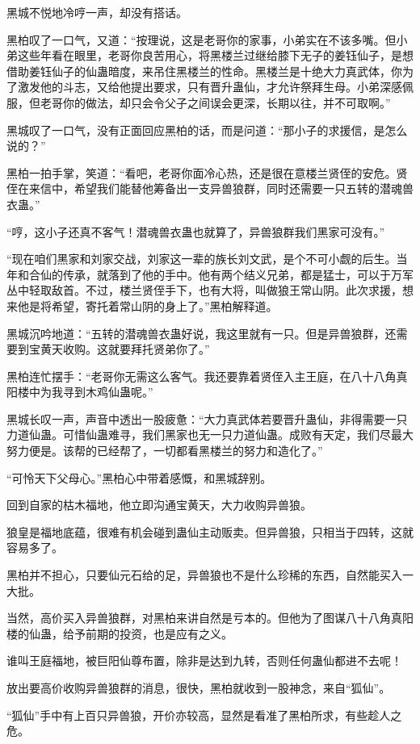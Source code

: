 \begin{this_body}
黑城不悦地冷哼一声，却没有搭话。

黑柏叹了一口气，又道：“按理说，这是老哥你的家事，小弟实在不该多嘴。但小弟这些年看在眼里，老哥你良苦用心，将黑楼兰过继给膝下无子的姜钰仙子，是想借助姜钰仙子的仙蛊暗度，来吊住黑楼兰的性命。黑楼兰是十绝大力真武体，你为了激发他的斗志，又给他提出要求，只有晋升蛊仙，才允许祭拜生母。小弟深感佩服，但老哥你的做法，却只会令父子之间误会更深，长期以往，并不可取啊。”

黑城叹了一口气，没有正面回应黑柏的话，而是问道：“那小子的求援信，是怎么说的？”

黑柏一拍手掌，笑道：“看吧，老哥你面冷心热，还是很在意楼兰贤侄的安危。贤侄在来信中，希望我们能替他筹备出一支异兽狼群，同时还需要一只五转的潜魂兽衣蛊。”

“哼，这小子还真不客气！潜魂兽衣蛊也就算了，异兽狼群我们黑家可没有。”

“现在咱们黑家和刘家交战，刘家这一辈的族长刘文武，是个不可小觑的后生。当年和合仙的传承，就落到了他的手中。他有两个结义兄弟，都是猛士，可以于万军丛中轻取敌首。不过，楼兰贤侄手下，也有大将，叫做狼王常山阴。此次求援，想来他是将希望，寄托着常山阴的身上了。”黑柏解释道。

黑城沉吟地道：“五转的潜魂兽衣蛊好说，我这里就有一只。但是异兽狼群，还需要到宝黄天收购。这就要拜托贤弟你了。”

黑柏连忙摆手：“老哥你无需这么客气。我还要靠着贤侄入主王庭，在八十八角真阳楼中为我寻到木鸡仙蛊呢。”

黑城长叹一声，声音中透出一股疲惫：“大力真武体若要晋升蛊仙，非得需要一只力道仙蛊。可惜仙蛊难寻，我们黑家也无一只力道仙蛊。成败有天定，我们尽最大努力便是。该帮的已经帮了，一切都看黑楼兰的努力和造化了。”

“可怜天下父母心。”黑柏心中带着感慨，和黑城辞别。

回到自家的枯木福地，他立即沟通宝黄天，大力收购异兽狼。

狼皇是福地底蕴，很难有机会碰到蛊仙主动贩卖。但异兽狼，只相当于四转，这就容易多了。

黑柏并不担心，只要仙元石给的足，异兽狼也不是什么珍稀的东西，自然能买入一大批。

当然，高价买入异兽狼群，对黑柏来讲自然是亏本的。但他为了图谋八十八角真阳楼的仙蛊，给予前期的投资，也是应有之义。

谁叫王庭福地，被巨阳仙尊布置，除非是达到九转，否则任何蛊仙都进不去呢！

放出要高价收购异兽狼群的消息，很快，黑柏就收到一股神念，来自“狐仙”。

“狐仙”手中有上百只异兽狼，开价亦较高，显然是看准了黑柏所求，有些趁人之危。


\end{this_body}
